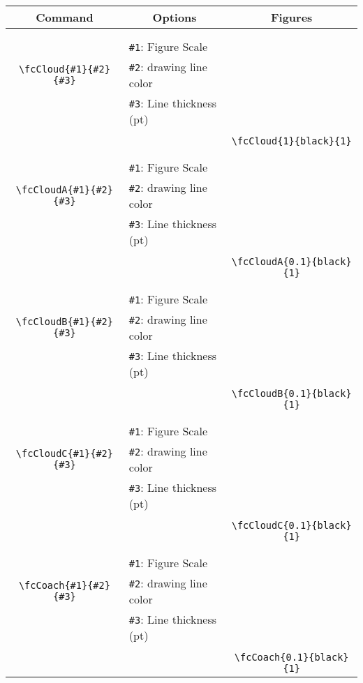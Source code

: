 \documentclass[x11names]{article}
\begin{document}
\begin{table}[H]\centering\begin{tabular}{|c|l|c|}\hline {\bf Command}& \multicolumn{1}{c|}{{\bf Options}} & {\bf Figures}\\  \hline	&&\multirow{5}{*}{\fcCloud{1}{black}{1}}\\	&&\\	&\verb|#1|: Figure Scale &\\	\verb|\fcCloud{#1}{#2}{#3}|&	\verb|#2|: drawing line color &\\	&\verb|#3|: Line thickness (pt) &\\ &&\\&&	\verb|\fcCloud{1}{black}{1}|\\\hline 	
	&&\multirow{5}{*}{\fcCloudA{0.1}{black}{1}}\\	&&\\	&\verb|#1|: Figure Scale &\\	\verb|\fcCloudA{#1}{#2}{#3}|&	\verb|#2|: drawing line color &\\	&\verb|#3|: Line thickness (pt) &\\ &&\\&&	\verb|\fcCloudA{0.1}{black}{1}|\\\hline 	
	&&\multirow{5}{*}{\fcCloudB{0.1}{black}{1}}\\	&&\\	&\verb|#1|: Figure Scale &\\	\verb|\fcCloudB{#1}{#2}{#3}|&	\verb|#2|: drawing line color &\\	&\verb|#3|: Line thickness (pt) &\\ &&\\&&	\verb|\fcCloudB{0.1}{black}{1}|\\\hline 	
	&&\multirow{5}{*}{\fcCloudC{0.1}{black}{1}}\\	&&\\	&\verb|#1|: Figure Scale &\\	\verb|\fcCloudC{#1}{#2}{#3}|&	\verb|#2|: drawing line color &\\	&\verb|#3|: Line thickness (pt) &\\ &&\\&&	\verb|\fcCloudC{0.1}{black}{1}|\\\hline 	
	&&\multirow{5}{*}{\fcCoach{0.1}{black}{1}}\\	&&\\	&\verb|#1|: Figure Scale &\\	\verb|\fcCoach{#1}{#2}{#3}|&	\verb|#2|: drawing line color &\\	&\verb|#3|: Line thickness (pt) &\\ &&\\&&	\verb|\fcCoach{0.1}{black}{1}|\\\hline 	

\end{tabular}
\end{table}
\end{document}
